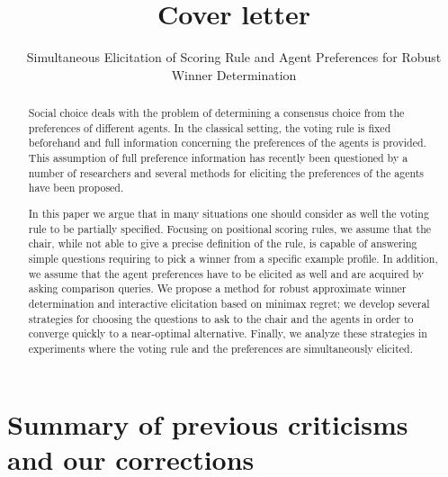 \documentclass[version=3.21, pagesize, twoside=off, bibliography=totoc, DIV=calc, fontsize=12pt, a4paper]{scrartcl}
\title{Cover letter}
\subtitle{Simultaneous Elicitation of Scoring Rule and Agent Preferences for Robust Winner Determination}
\author{}
\date{}
\begin{document}
\maketitle

\begin{abstract}
Social choice deals with the problem of determining a consensus choice from the preferences of different agents.
In the classical setting, the voting rule is fixed beforehand and full information concerning the preferences of the agents is provided.
This assumption of full preference information has recently been questioned by a number of researchers and
	several methods for eliciting the preferences of the agents have been proposed.

In this paper we argue that in many situations one should consider as well the voting rule to be 	partially specified.
	Focusing on positional scoring rules, we assume that the chair, while not able to give a precise definition of the rule, is capable of answering simple questions requiring to pick a winner from a specific example profile. In addition, we assume that the agent preferences have to be elicited as well and are acquired by asking comparison queries. 
	We propose a method for robust approximate winner determination and interactive elicitation based on minimax regret; we develop several strategies for choosing the questions to ask to  the chair and the agents in order to %
converge quickly to a near-optimal alternative. Finally, we analyze these strategies in experiments %
 where the voting rule and the preferences are simultaneously elicited.
\end{abstract}

\section{Summary of previous criticisms and our corrections}
\end{document}
